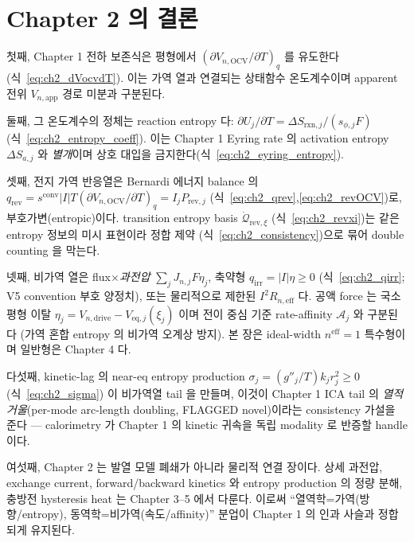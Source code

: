 \documentclass[11pt,a4paper]{article}
\newcommand{\eff}{\mathrm{eff}}
\newcommand{\eq}{\mathrm{eq}}
\newcommand{\app}{\mathrm{app}}
\newcommand{\drive}{\mathrm{drive}}
\newcommand{\OCV}{\mathrm{OCV}}
\newcommand{\irr}{\mathrm{irr}}
\newcommand{\rev}{\mathrm{rev}}
\newcommand{\rxn}{\mathrm{rxn}}
\newcommand{\conv}{\mathrm{conv}}
\begin{document}
\section{Chapter 2 의 결론}\label{sec:ch2_concl}
첫째, Chapter 1 전하 보존식은 평형에서 $(\partial V_{n,\OCV}/\partial T)_q$ 를 유도한다(식~\eqref{eq:ch2_dVocvdT}).
이는 가역 열과 연결되는 상태함수 온도계수이며 apparent 전위 $V_{n,\app}$ 경로 미분과 구분된다.

둘째, 그 온도계수의 정체는 reaction entropy 다: $\partial U_j/\partial T=\Delta S_{\rxn,j}/(s_{\phi,j}F)$
(식~\eqref{eq:ch2_entropy_coeff}). 이는 Chapter 1 Eyring rate 의 activation entropy $\Delta S_{a,j}$ 와
\emph{별개}이며 상호 대입을 금지한다(식~\eqref{eq:ch2_eyring_entropy}).

셋째, 전지 가역 반응열은 Bernardi 에너지 balance 의 $q_\rev=s^{\conv}|I|T(\partial V_{n,\OCV}/\partial T)_q
=I_jP_{\rev,j}$ (식~\eqref{eq:ch2_qrev},\eqref{eq:ch2_revOCV})로, 부호가변(entropic)이다. transition entropy basis
$\dot{\mathcal Q}_{\rev,\xi}$ (식~\eqref{eq:ch2_revxi})는 같은 entropy 정보의 미시 표현이라 정합 제약
(식~\eqref{eq:ch2_consistency})으로 묶어 double counting 을 막는다.

넷째, 비가역 열은 flux$\times$\emph{과전압} $\sum_jJ_{n,j}F\eta_j$, 축약형 $q_\irr=|I|\eta\ge0$
(식~\eqref{eq:ch2_qirr}; V5 convention 부호 양정치), 또는 물리적으로 제한된 $I^2R_{n,\eff}$ 다. 공액 force 는 국소
평형 이탈 $\eta_j=V_{n,\drive}-V_{\eq,j}(\xi_j)$ 이며 전이 중심 기준 rate-affinity $\mathcal A_j$ 와 구분된다
(가역 혼합 entropy 의 비가역 오계상 방지). 본 장은 ideal-width $n^\eff=1$ 특수형이며 일반형은 Chapter 4 다.

다섯째, kinetic-lag 의 near-eq entropy production $\sigma_j=(g''_j/T)k_j r_j^2\ge0$ (식~\eqref{eq:ch2_sigma})
이 비가역열 tail 을 만들며, 이것이 Chapter 1 ICA tail 의 \emph{열적 거울}(per-mode arc-length doubling, FLAGGED
novel)이라는 consistency 가설을 준다 — calorimetry 가 Chapter 1 의 kinetic 귀속을 독립 modality 로 반증할
handle 이다.

여섯째, Chapter 2 는 발열 모델 폐쇄가 아니라 물리적 연결 장이다. 상세 과전압, exchange current,
forward/backward kinetics 와 entropy production 의 정량 분해, 충방전 hysteresis heat 는 Chapter 3--5 에서
다룬다. 이로써 ``열역학=가역(방향/entropy), 동역학=비가역(속도/affinity)'' 분업이 Chapter 1 의 인과 사슬과
정합되게 유지된다.
\end{document}
